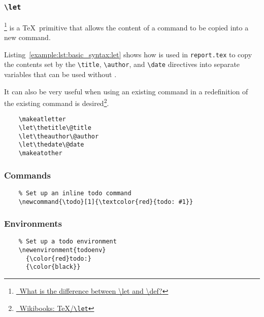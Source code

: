 \subsubsection{\texttt{\textbackslash let}}
\footnote{\href{https://tex.stackexchange.com/questions/258/what-is-the-difference-between-let-and-def}{\faStackExchange\ What is the difference between \textbackslash let and \textbackslash def?}} is a \TeX\ primitive that allows the content of a command to be copied into a new command.

Listing~\ref{example:lst:basic_syntax:let} shows how  is used in \texttt{report.tex} to copy the contents set by the \texttt{\textbackslash title}, \texttt{\textbackslash author}, and \texttt{\textbackslash date} directives into separate variables that can be used without .

It can also be very useful when using an existing command in a redefinition of the existing command is desired\footnote{\href{https://en.wikibooks.org/wiki/TeX/let}{\faBook\ Wikibooks: \TeX{}/\texttt{\textbackslash let}}}.

\begin{listing}[H]
  \captionsetup{skip=\skiplistingcaptionlen}
  \begin{verbatim}
    \makeatletter
    \let\thetitle\@title
    \let\theauthor\@author
    \let\thedate\@date
    \makeatother
  \end{verbatim}
  \caption{\texttt{\textbackslash let} command example}
  \label{example:lst:basic_syntax:let}
\end{listing}

\pagebreak
\subsubsection*{Commands}
\begin{listing}[H]
  \captionsetup{skip=\skiplistingcaptionlen}
  \begin{verbatim}
    % Set up an inline todo command
    \newcommand{\todo}[1]{\textcolor{red}{todo: #1}}
  \end{verbatim}
  \caption{\texttt{\textbackslash newcommand} command example}
  \label{example:lst:newcommand}
\end{listing}

\subsubsection*{Environments}
\begin{listing}[H]
  \captionsetup{skip=\skiplistingcaptionlen}
  \begin{verbatim}
    % Set up a todo environment
    \newenvironment{todoenv}
      {\color{red}todo:}
      {\color{black}}
  \end{verbatim}
  \caption{\texttt{\textbackslash newenvironment} command example}
  \label{example:lst:newenvironment}
\end{listing}

